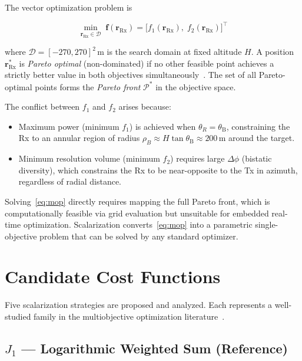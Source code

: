\documentclass[journal]{IEEEtran}
\newcommand{\Rx}{\mathrm{Rx}}
\newcommand{\rRx}{\mathbf{r}_{\Rx}}
\newcommand{\thetaB}{\theta_{\mathrm{B}}}
\begin{document}
The vector optimization problem is

\begin{equation}
  \min_{\rRx \in \mathcal{D}} \; \mathbf{f}(\rRx)
  = \bigl[f_1(\rRx),\; f_2(\rRx)\bigr]^{\top}
  \label{eq:mop}
\end{equation}

where $\mathcal{D} = [-270,270]^2\,\mathrm{m}$ is the search domain at fixed
altitude $H$. A position $\rRx^*$ is \emph{Pareto optimal} (non-dominated) if
no other feasible point achieves a strictly better value in both objectives
simultaneously~\cite{miettinen1998}. The set of all Pareto-optimal points forms
the \emph{Pareto front} $\mathcal{P}^*$ in the objective space.

The conflict between $f_1$ and $f_2$ arises because:
\begin{itemize}
  \item Maximum power (minimum $f_1$) is achieved when $\theta_R = \thetaB$,
    constraining the Rx to an annular region of radius
    $\rho_B \approx H\tan\thetaB \approx 200\,\mathrm{m}$ around the target.
  \item Minimum resolution volume (minimum $f_2$) requires large $\Delta\phi$
    (bistatic diversity), which constrains the Rx to be near-opposite to the
    Tx in azimuth, regardless of radial distance.
\end{itemize}

Solving~\eqref{eq:mop} directly requires mapping the full Pareto front, which
is computationally feasible via grid evaluation but unsuitable for embedded
real-time optimization. Scalarization converts~\eqref{eq:mop} into a
parametric single-objective problem that can be solved by any standard
optimizer.

\section{Candidate Cost Functions}
\label{sec:cost}

Five scalarization strategies are proposed and analyzed. Each represents a
well-studied family in the multiobjective optimization
literature~\cite{miettinen1998, deb2001, das1997}.

\subsection{\texorpdfstring{$J_1$}{J1} — Logarithmic Weighted Sum (Reference)}
\end{document}
